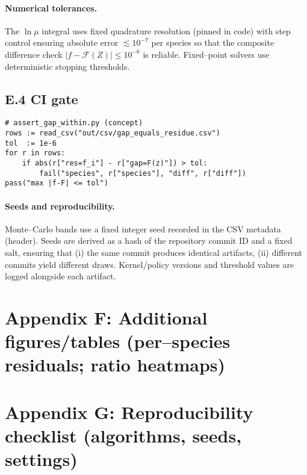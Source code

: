 \documentclass[epjc3]{svjour3}
\begin{document}
\paragraph{Numerical tolerances.}
The $\ln\mu$ integral uses fixed quadrature resolution (pinned in code) with step control ensuring absolute error $\lesssim 10^{-7}$ per species so that the composite difference check $|f-\mathcal F(Z)|\le 10^{-6}$ is reliable. Fixed–point solvers use deterministic stopping thresholds.

\subsection*{E.4 CI gate}
\begin{verbatim}
# assert_gap_within.py (concept)
rows := read_csv("out/csv/gap_equals_residue.csv")
tol  := 1e-6
for r in rows:
    if abs(r["res=f_i"] - r["gap=F(z)"]) > tol:
        fail("species", r["species"], "diff", r["diff"])
pass("max |f-F| <= tol")
\end{verbatim}

\paragraph{Seeds and reproducibility.}
Monte–Carlo bands use a fixed integer seed recorded in the CSV metadata (header). Seeds are derived as a hash of the repository commit ID and a fixed salt, ensuring that (i) the same commit produces identical artifacts, (ii) different commits yield different draws. Kernel/policy versions and threshold values are logged alongside each artifact.

\bigskip

\section*{Appendix F: Additional figures/tables (per–species residuals; ratio heatmaps)}
\section*{Appendix G: Reproducibility checklist (algorithms, seeds, settings)}
\end{document}
